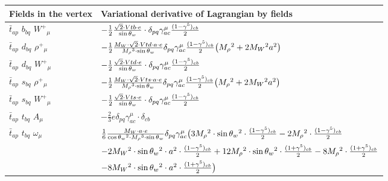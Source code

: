 \begin{center}
\begin{tabular}{|l|l|} \hline
Fields in the vertex & Variational derivative of Lagrangian by fields \\ \hline
$\bar{t}{}_{a p }$ \phantom{-} $b{}_{b q }$ \phantom{-} $W^+{}_{\mu }$ \phantom{-}  &
	$-\frac{1}{2}\frac{\sqrt{2} \cdot Vtb \cdot e}{ \sin{\theta}_w}\cdot \delta_{p q} \gamma_{a c}^\mu {(1-\gamma^5)_{c b}\over 2} $\\[2mm]
$\bar{t}{}_{a p }$ \phantom{-} $d{}_{b q }$ \phantom{-} $\rho^+{}_{\mu }$ \phantom{-}  &
	$-\frac{1}{2}\frac{ M_W \cdot\sqrt{2} \cdot Vtd \cdot a \cdot e}{ M_\rho{}^3  \cdot \sin{\theta}_w}\delta_{p q} \gamma_{a c}^\mu {(1-\gamma^5)_{c b}\over 2} \big( M_\rho{}^2 +2 M_W{}^2  a{}^2 \big)$\\[2mm]
$\bar{t}{}_{a p }$ \phantom{-} $d{}_{b q }$ \phantom{-} $W^+{}_{\mu }$ \phantom{-}  &
	$-\frac{1}{2}\frac{\sqrt{2} \cdot Vtd \cdot e}{ \sin{\theta}_w}\cdot \delta_{p q} \gamma_{a c}^\mu {(1-\gamma^5)_{c b}\over 2} $\\[2mm]
$\bar{t}{}_{a p }$ \phantom{-} $s{}_{b q }$ \phantom{-} $\rho^+{}_{\mu }$ \phantom{-}  &
	$-\frac{1}{2}\frac{ M_W \cdot\sqrt{2} \cdot Vts \cdot a \cdot e}{ M_\rho{}^3  \cdot \sin{\theta}_w}\delta_{p q} \gamma_{a c}^\mu {(1-\gamma^5)_{c b}\over 2} \big( M_\rho{}^2 +2 M_W{}^2  a{}^2 \big)$\\[2mm]
$\bar{t}{}_{a p }$ \phantom{-} $s{}_{b q }$ \phantom{-} $W^+{}_{\mu }$ \phantom{-}  &
	$-\frac{1}{2}\frac{\sqrt{2} \cdot Vts \cdot e}{ \sin{\theta}_w}\cdot \delta_{p q} \gamma_{a c}^\mu {(1-\gamma^5)_{c b}\over 2} $\\[2mm]
$\bar{t}{}_{a p }$ \phantom{-} $t{}_{b q }$ \phantom{-} ${A}_{\mu }$ \phantom{-}  &
	$-\frac{2}{3} e\delta_{p q} \gamma_{a c}^\mu \cdot \delta_{c b} $\\[2mm]
$\bar{t}{}_{a p }$ \phantom{-} $t{}_{b q }$ \phantom{-} $\omega{}_{\mu }$ \phantom{-}  &
	$\frac{1}{6}\frac{ M_W \cdot a \cdot e}{ \cos{\theta}_w{}^2  \cdot M_\rho{}^3  \cdot \sin{\theta}_w}\delta_{p q} \gamma_{a c}^\mu \big(3 M_\rho{}^2 \cdot  \sin{\theta}_w{}^2 \cdot {(1-\gamma^5)_{c b}\over 2} -2 M_\rho{}^2 \cdot {(1-\gamma^5)_{c b}\over 2} $ \\[2mm]
  & $-2 M_W{}^2 \cdot  \sin{\theta}_w{}^2 \cdot  a{}^2 \cdot {(1-\gamma^5)_{c b}\over 2} +12 M_\rho{}^2 \cdot  \sin{\theta}_w{}^2 \cdot {(1+\gamma^5)_{c b}\over 2} -8 M_\rho{}^2 \cdot {(1+\gamma^5)_{c b}\over 2} $ \\[2mm]
  & $-8 M_W{}^2 \cdot  \sin{\theta}_w{}^2 \cdot  a{}^2 \cdot {(1+\gamma^5)_{c b}\over 2} \big)$\\[2mm]

\end{tabular}
\end{center}
